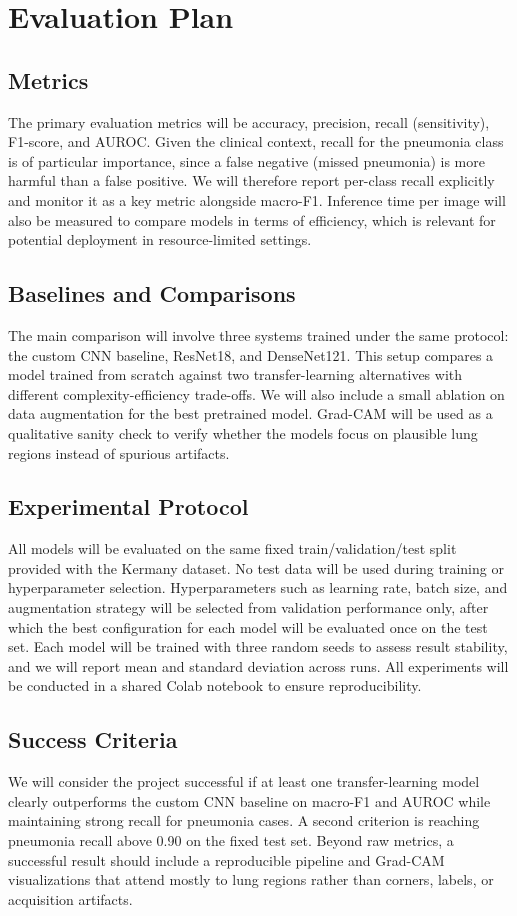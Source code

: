 \documentclass[acmsmall,screen,nonacm]{acmart}
\begin{document}
\section{Evaluation Plan}

\subsection{Metrics}
The primary evaluation metrics will be accuracy, precision, recall (sensitivity), F1-score, and AUROC. Given the clinical context, recall for the pneumonia class is of particular importance, since a false negative (missed pneumonia) is more harmful than a false positive. We will therefore report per-class recall explicitly and monitor it as a key metric alongside macro-F1. Inference time per image will also be measured to compare models in terms of efficiency, which is relevant for potential deployment in resource-limited settings.

\subsection{Baselines and Comparisons}
The main comparison will involve three systems trained under the same protocol: the custom CNN baseline, ResNet18, and DenseNet121. This setup compares a model trained from scratch against two transfer-learning alternatives with different complexity-efficiency trade-offs. We will also include a small ablation on data augmentation for the best pretrained model. Grad-CAM will be used as a qualitative sanity check to verify whether the models focus on plausible lung regions instead of spurious artifacts.

\subsection{Experimental Protocol}
All models will be evaluated on the same fixed train/validation/test split provided with the Kermany dataset. No test data will be used during training or hyperparameter selection. Hyperparameters such as learning rate, batch size, and augmentation strategy will be selected from validation performance only, after which the best configuration for each model will be evaluated once on the test set. Each model will be trained with three random seeds to assess result stability, and we will report mean and standard deviation across runs. All experiments will be conducted in a shared Colab notebook to ensure reproducibility.

\subsection{Success Criteria}
We will consider the project successful if at least one transfer-learning model clearly outperforms the custom CNN baseline on macro-F1 and AUROC while maintaining strong recall for pneumonia cases. A second criterion is reaching pneumonia recall above 0.90 on the fixed test set. Beyond raw metrics, a successful result should include a reproducible pipeline and Grad-CAM visualizations that attend mostly to lung regions rather than corners, labels, or acquisition artifacts.
\end{document}
